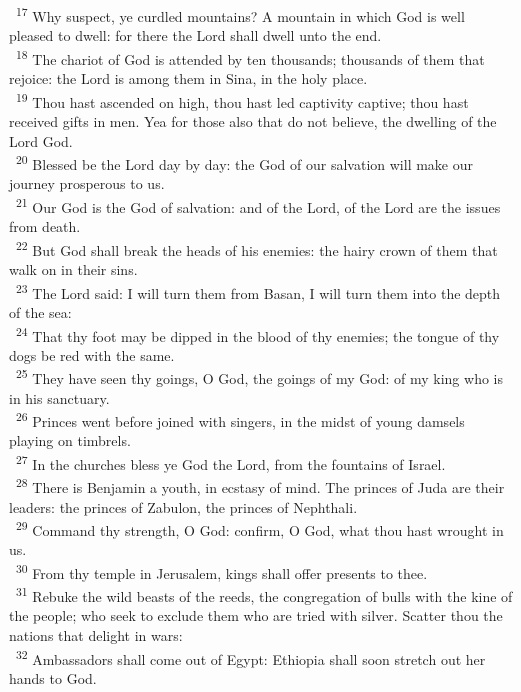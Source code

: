 \documentclass[a5paper,12pt]{article}
\begin{document}
\begin{multicols*}{2}
~\textsuperscript{17} Why suspect, ye curdled mountains? A mountain in which God is well pleased to dwell: for there the Lord shall dwell unto the end.\\
~\textsuperscript{18} The chariot of God is attended by ten thousands; thousands of them that rejoice: the Lord is among them in Sina, in the holy place.\\
~\textsuperscript{19} Thou hast ascended on high, thou hast led captivity captive; thou hast received gifts in men. Yea for those also that do not believe, the dwelling of the Lord God.\\
~\textsuperscript{20} Blessed be the Lord day by day: the God of our salvation will make our journey prosperous to us.\\
~\textsuperscript{21} Our God is the God of salvation: and of the Lord, of the Lord are the issues from death.\\
~\textsuperscript{22} But God shall break the heads of his enemies: the hairy crown of them that walk on in their sins.\\
~\textsuperscript{23} The Lord said: I will turn them from Basan, I will turn them into the depth of the sea:\\
~\textsuperscript{24} That thy foot may be dipped in the blood of thy enemies; the tongue of thy dogs be red with the same.\\
~\textsuperscript{25} They have seen thy goings, O God, the goings of my God: of my king who is in his sanctuary.\\
~\textsuperscript{26} Princes went before joined with singers, in the midst of young damsels playing on timbrels.\\
~\textsuperscript{27} In the churches bless ye God the Lord, from the fountains of Israel.\\
~\textsuperscript{28} There is Benjamin a youth, in ecstasy of mind. The princes of Juda are their leaders: the princes of Zabulon, the princes of Nephthali.\\
~\textsuperscript{29} Command thy strength, O God: confirm, O God, what thou hast wrought in us.\\
~\textsuperscript{30} From thy temple in Jerusalem, kings shall offer presents to thee.\\
~\textsuperscript{31} Rebuke the wild beasts of the reeds, the congregation of bulls with the kine of the people; who seek to exclude them who are tried with silver. Scatter thou the nations that delight in wars:\\
~\textsuperscript{32} Ambassadors shall come out of Egypt: Ethiopia shall soon stretch out her hands to God.\\

\end{multicols*}
\end{document}
